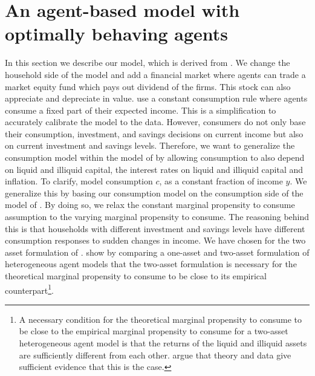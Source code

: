 
\section{An agent-based model with optimally behaving agents} %
\label{Model} 
In this section we describe our model, which is derived from \cite{poledna_economic_2019}. We change the household side of the model and add a financial market where agents can trade a market equity fund which pays out dividend of the firms. This stock can also appreciate and depreciate in value. \cite{poledna_economic_2019} use a constant consumption rule where agents consume a fixed part of their expected income. This is a simplification to accurately calibrate the model to the data. However, consumers do not only base their consumption, investment, and savings decisions on current income but also on current investment and savings levels. Therefore, we want to generalize the consumption model within the model of \cite{poledna_economic_2019} by allowing consumption to also depend on liquid and illiquid capital, the interest rates on liquid and illiquid capital and inflation. To clarify, 
\cite{poledna_economic_2019} model consumption $c$, as a constant fraction of income $y$. We generalize this by basing our consumption model on the consumption side of the model of \cite{kaplan_monetary_2018}. By doing so, we relax the constant marginal propensity to consume assumption to the varying marginal propensity to consume. The reasoning behind this is that households with different investment and savings levels have different consumption responses to sudden changes in income. We have chosen for the two asset formulation of \cite{kaplan_monetary_2018}. \cite{kaplan_marginal_nodate} show by comparing a one-asset and two-asset formulation of heterogeneous agent models that the two-asset  formulation is necessary for the theoretical marginal propensity to consume to be close to its empirical counterpart\footnote{A necessary condition for the theoretical marginal propensity to consume to be close to the empirical marginal propensity to consume for a two-asset heterogeneous agent model is that the returns of the liquid and illiquid assets are sufficiently different from each other. \cite{kaplan_marginal_nodate} argue that theory and data give sufficient evidence that this is the case.}.
